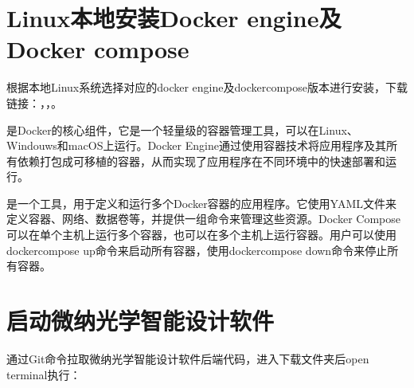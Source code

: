 \documentclass[letterpaper,10pt,english]{sphinxmanual}
\begin{document}
\section{Linux本地安装Docker engine及Docker compose}
\label{\detokenize{_u8f6f_u4ef6_u5b89_u88c5/index:linuxdocker-enginedocker-compose}}
\sphinxAtStartPar
根据本地Linux系统选择对应的docker engine及docker\sphinxhyphen{}compose版本进行安装，下载链接：，，。

\sphinxAtStartPar
{}是Docker的核心组件，它是一个轻量级的容器管理工具，可以在Linux、Windouws和macOS上运行。Docker Engine通过使用容器技术将应用程序及其所有依赖打包成可移植的容器，从而实现了应用程序在不同环境中的快速部署和运行。

\sphinxAtStartPar
{}是一个工具，用于定义和运行多个Docker容器的应用程序。它使用YAML文件来定义容器、网络、数据卷等，并提供一组命令来管理这些资源。Docker Compose可以在单个主机上运行多个容器，也可以在多个主机上运行容器。用户可以使用docker\sphinxhyphen{}compose up命令来启动所有容器，使用docker\sphinxhyphen{}compose down命令来停止所有容器。


\section{启动微纳光学智能设计软件}
\label{\detokenize{_u8f6f_u4ef6_u5b89_u88c5/index:id2}}
\sphinxAtStartPar
通过Git命令拉取微纳光学智能设计软件后端代码，进入下载文件夹后open terminal执行：
\end{document}
